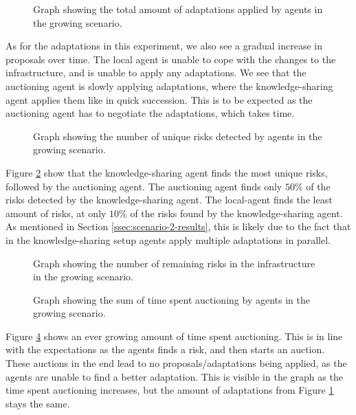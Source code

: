 \begin{figure}[H]
    \centering
    
    \caption{Graph showing the total amount of adaptations applied by agents in the growing scenario.}
    \label{fig:proposals-growing}
\end{figure}

As for the adaptations in this experiment, we also see a gradual increase in proposals over time. The local agent is unable to cope with the changes to the infrastructure, and is unable to apply any adaptations. We see that the auctioning agent is slowly applying adaptations, where the knowledge-sharing agent applies them like in quick succession. This is to be expected as the auctioning agent has to negotiate the adaptations, which takes time.

\begin{figure}[H]
    \centering
        
    \caption{Graph showing the number of unique risks detected by agents in the growing scenario.}
    \label{fig:risk-count-growing}
\end{figure}

Figure \ref{fig:risk-count-growing} show that the knowledge-sharing agent finds the most unique risks, followed by the auctioning agent. The auctioning agent finds only $50\%$ of the risks detected by the knowledge-sharing agent. The local-agent finds the least amount of risks, at only $10\%$ of the risks found by the knowledge-sharing agent. As mentioned in Section \ref{ssec:scenario-2-results}, this is likely due to the fact that in the knowledge-sharing setup agents apply multiple adaptations in parallel. 

\begin{figure}[H]
    \centering
        
    \caption{Graph showing the number of remaining risks in the infrastructure in the growing scenario.}
    \label{fig:risk-remaining-growing}
\end{figure}


\begin{figure}[H]
    \centering
        
    \caption{Graph showing the sum of time spent auctioning by agents in the growing scenario.}
    \label{fig:auctioning-time-growing}
\end{figure}

Figure \ref{fig:auctioning-time-growing} shows an ever growing amount of time spent auctioning. This is in line with the expectations as the agents finds a risk, and then starts an auction. These auctions in the end lead to no proposals/adaptations being applied, as the agents are unable to find a better adaptation. This is visible in the graph as the time spent auctioning increases, but the amount of adaptations from Figure \ref{fig:proposals-growing} stays the same.

